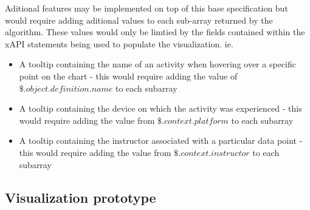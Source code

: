 \documentclass{article}
\begin{document}
  Aditional features may be implemented on top of
  this base specification but would require adding aditional values to
  each sub-array returned by the algorithm. These values would only be
  limtied by the fields contained within the xAPI statements being
  used to populate the visualization. ie.
  \begin{itemize}
    \item A tooltip containing the name of an activity when hovering
      over a specific point on the chart
      \subitem - this would require adding the value of
      $\$.object.definition.name$ to each subarray
    \item A tooltip containing the device on which the activity was experienced
      \subitem - this would require adding the value from
      $\$.context.platform$ to each subarray
    \item A tooltip containing the instructor associated with a
      particular data point
      \subitem - this would require adding the value from
      $\$.context.instructor$ to each subarray
  \end{itemize}


  \subsection{Visualization prototype}

\end{document}
